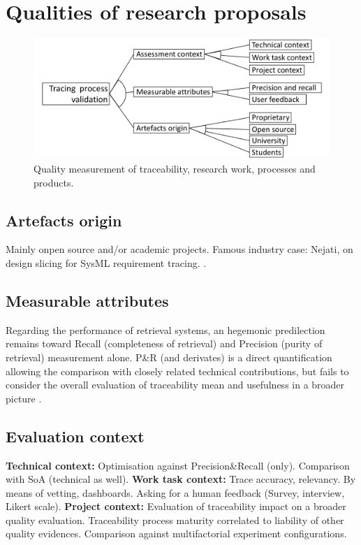 

\section{Qualities of research proposals}
\begin{figure}[h]
	\centering
	\includegraphics[width=.65\linewidth]{images/fm-quality}
	\caption{Quality measurement of traceability, research work, processes and products.}
	\label{fig:fm:quality}
\end{figure}


\subsection{Artefacts origin}
Mainly onpen source and/or academic projects.
Famous industry case: Nejati, on design slicing for SysML requirement tracing. .


\subsection{Measurable attributes} 
Regarding the performance of retrieval systems, an hegemonic predilection remains toward Recall (completeness of retrieval) and Precision (purity of retrieval) measurement alone. P\&R (and derivates) is a direct quantification allowing the comparison with closely related technical contributions, but fails to consider the overall evaluation of traceability mean and usefulness in a broader picture .

\subsection{Evaluation context} \textbf{Technical context:} Optimisation against Precision\&Recall (only). Comparison with SoA (technical as well).
\textbf{Work task context:} Trace accuracy, relevancy. By means of vetting, dashboards. Asking for a human feedback (Survey, interview, Likert scale).
\textbf{Project context:} Evaluation of traceability impact on a broader quality evaluation. Traceability process maturity correlated to liability of other quality evidences. Comparison against multifactorial experiment configurations.

